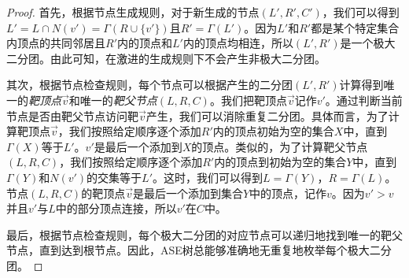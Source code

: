 \begin{proof}
  首先，根据节点生成规则，对于新生成的节点$(L',R',C')$，我们可以得到$L'=L\cap N(v')=\Gamma(R\cup\{v'\})$且$R'=\Gamma(L')$。因为$L'$和$R'$都是某个特定集合内顶点的共同邻居且$R'$内的顶点和$L'$内的顶点均相连，所以$(L',R')$是一个极大二分团。由此可知，在激进的生成规则下不会产生非极大二分团。

  其次，根据节点检查规则，每个节点可以根据产生的二分团$(L',R')$计算得到唯一的\emph{靶顶点$\vec{v}$}和唯一的\emph{靶父节点}$(L,R,C)$。我们把靶顶点$\vec{v}$记作$v'$。通过判断当前节点是否由靶父节点访问靶$\vec{v}$产生，我们可以消除重复二分团。具体而言，为了计算靶顶点$\vec{v}$，我们按照给定顺序逐个添加$R'$内的顶点初始为空的集合$X$中，直到$\Gamma(X)$等于$L'$。$v'$是最后一个添加到$X$的顶点。类似的，为了计算靶父节点$(L,R,C)$，我们按照给定顺序逐个添加$R'$内的顶点到初始为空的集合$Y$中，直到$\Gamma(Y)$和$N(v')$的交集等于$L'$。这时，我们可以得到$L=\Gamma(Y)$，$R=\Gamma(L)$。节点$(L,R,C)$的靶顶点$\vec{v}$是最后一个添加到集合$Y$中的顶点，记作$v$。因为$v'>v$并且$v'$与$L$中的部分顶点连接，所以$v'$在$C$中。
  
  最后，根据节点检查规则，每个极大二分团的对应节点可以递归地找到唯一的靶父节点，直到达到根节点。因此，ASE树总能够准确地无重复地枚举每个极大二分团。
\end{proof}
















